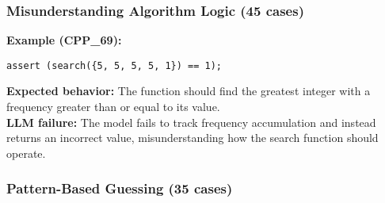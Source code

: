 


\subsubsection{Misunderstanding Algorithm Logic (45 cases)}
\textbf{Example (CPP\_69):}
\begin{verbatim}
assert (search({5, 5, 5, 5, 1}) == 1);
\end{verbatim}
\textbf{Expected behavior:} The function should find the greatest integer with a frequency greater than or equal to its value.\\  
\textbf{LLM failure:} The model fails to track frequency accumulation and instead returns an incorrect value, misunderstanding how the search function should operate.

\subsubsection{Pattern-Based Guessing (35 cases)}
\label{subsubsec:appendix:example_pattern_Guess}
